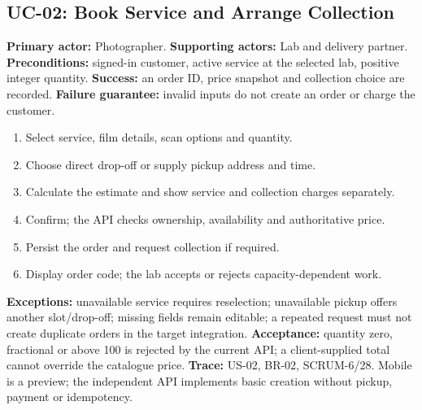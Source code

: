 \subsection{UC-02: Book Service and Arrange Collection}
\textbf{Primary actor:} Photographer. \textbf{Supporting actors:} Lab and delivery
partner. \textbf{Preconditions:} signed-in customer, active service at the selected
lab, positive integer quantity. \textbf{Success:} an order ID, price snapshot and
collection choice are recorded. \textbf{Failure guarantee:} invalid inputs do not
create an order or charge the customer.
\begin{enumerate}
\item Select service, film details, scan options and quantity.
\item Choose direct drop-off or supply pickup address and time.
\item Calculate the estimate and show service and collection charges separately.
\item Confirm; the API checks ownership, availability and authoritative price.
\item Persist the order and request collection if required.
\item Display order code; the lab accepts or rejects capacity-dependent work.
\end{enumerate}
\textbf{Exceptions:} unavailable service requires reselection; unavailable pickup
offers another slot/drop-off; missing fields remain editable; a repeated request
must not create duplicate orders in the target integration.
\textbf{Acceptance:} quantity zero, fractional or above 100 is rejected by the
current API; a client-supplied total cannot override the catalogue price.
\textbf{Trace:} US-02, BR-02, SCRUM-6/28. Mobile is a preview; the independent
API implements basic creation without pickup, payment or idempotency.

\clearpage
